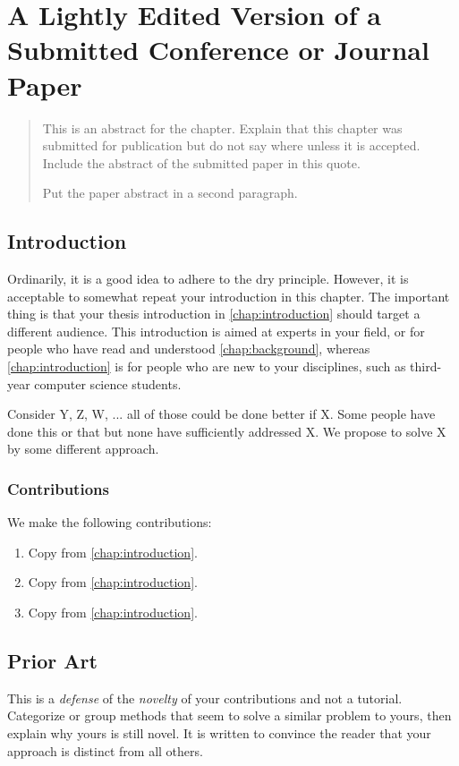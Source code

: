 \chapter{A Lightly Edited Version of a Submitted Conference or Journal Paper}
\label{chap:APaper}

\begin{quote}
    This is an abstract for the chapter. Explain that this chapter was submitted for publication but do not say where unless it is accepted. Include the abstract of the submitted paper in this quote.

    Put the paper abstract in a second paragraph.
\end{quote}


\section{Introduction}

Ordinarily, it is a good idea to adhere to the \gls{dry} principle. However, it is acceptable to somewhat repeat your introduction in this chapter.
The important thing is that your thesis introduction in \autoref{chap:introduction} should target a different audience. This introduction is aimed at experts in your field, or for people who have read and understood \autoref{chap:background}, whereas \autoref{chap:introduction} is for people who are new to your disciplines, such as third-year computer science students.

Consider Y, Z, W, ... all of those could be done better if  X. Some people have done this or that but none have sufficiently addressed X.  We propose to solve X by some different approach.

\subsection{Contributions}
We make the following contributions:
\begin{enumerate}
    \item Copy from \autoref{chap:introduction}.
    \item Copy from \autoref{chap:introduction}.
    \item Copy from \autoref{chap:introduction}.
\end{enumerate}

\section{Prior Art}\label{sec:prior-art}
This is a \textit{defense} of the \textit{novelty} of your contributions and not a tutorial.
Categorize or group methods that seem to solve a similar problem to yours, then explain why yours is still novel. It is written to convince the reader that your approach is distinct from all others.


